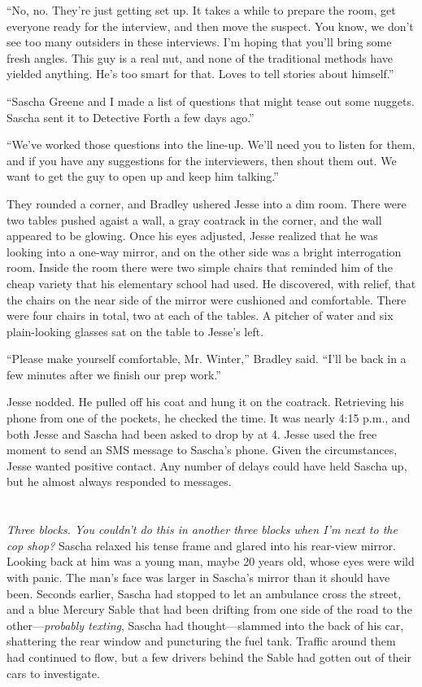 \documentclass[12pt]{book}
\begin{document}
``No, no.  They're just getting set up.  It takes a while to prepare the room, get everyone ready for the interview, and then move the suspect.  You know, we don't see too many outsiders in these interviews.  I'm hoping that you'll bring some fresh angles.  This guy is a real nut, and none of the traditional methods have yielded anything.  He's too smart for that.  Loves to tell stories about himself.''

``Sascha Greene and I made a list of questions that might tease out some nuggets.  Sascha sent it to Detective Forth a few days ago.''

``We've worked those questions into the line-up.  We'll need you to listen for them, and if you have any suggestions for the interviewers, then shout them out.  We want to get the guy to open up and keep him talking.''

They rounded a corner, and Bradley ushered Jesse into a dim room.  There were two tables pushed agaist a wall, a gray coatrack in the corner, and the wall appeared to be glowing.  Once his eyes adjusted, Jesse realized that he was looking into a one-way mirror, and on the other side was a bright interrogation room.  Inside the room there were two simple chairs that reminded him of the cheap variety that his elementary school had used.  He discovered, with relief, that the chairs on the near side of the mirror were cushioned and comfortable.  There were four chairs in total, two at each of the tables.  A pitcher of water and six plain-looking glasses sat on the table to Jesse's left.

``Please make yourself comfortable, Mr. Winter,'' Bradley said.  ``I'll be back in a few minutes after we finish our prep work.''

Jesse nodded.  He pulled off his coat and hung it on the coatrack.  Retrieving his phone from one of the pockets, he checked the time.  It was nearly 4:15 p.m., and both Jesse and Sascha had been asked to drop by at 4.  Jesse used the free moment to send an SMS message to Sascha's phone.  Given the circumstances, Jesse wanted positive contact.  Any number of delays could have held Sascha up, but he almost always responded to messages.

\chapter{}

\emph{Three blocks.  You couldn't do this in another \emph{three blocks} when I'm next to the cop shop?}  Sascha relaxed his tense frame and glared into his rear-view mirror.  Looking back at him was a young man, maybe 20 years old, whose eyes were wild with panic.  The man's face was larger in Sascha's mirror than it should have been.  Seconds earlier, Sascha had stopped to let an ambulance cross the street, and a blue Mercury Sable that had been drifting from one side of the road to the other---\emph{probably texting}, Sascha had thought---slammed into the back of his car, shattering the rear window and puncturing the fuel tank.  Traffic around them had continued to flow, but a few drivers behind the Sable had gotten out of their cars to investigate.
\end{document}
